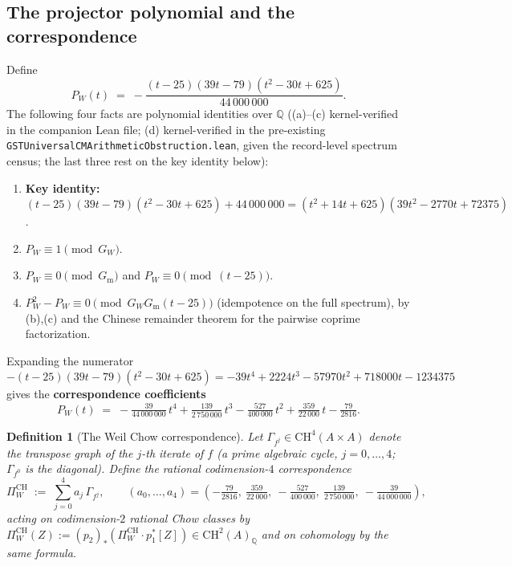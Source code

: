 \documentclass[11pt]{article}
\newtheorem{definition}{Definition}
\begin{document}
\subsection{The projector polynomial and the correspondence}\label{sec:projpoly}
Define
\[
P_W(t)\;=\;-\frac{(t-25)(39t-79)(t^2-30t+625)}{44\,000\,000}.
\]
The following four facts are polynomial identities over $\mathbb{Q}$ ((a)--(c) kernel-verified in the companion
Lean file; (d) kernel-verified in the pre-existing \texttt{GSTUniversalCMArithmeticObstruction.lean}, given the
record-level spectrum census; the last three rest on the key identity below):
\begin{enumerate}[label=(\alph*)]
\item \textbf{Key identity:}\quad $(t-25)(39t-79)(t^2-30t+625)+44\,000\,000=(t^2+14t+625)(39t^2-2770t+72375)$.
\item $P_W\equiv 1 \pmod{G_W}$.
\item $P_W\equiv 0 \pmod{G_{\mathrm{m}}}$ and $P_W\equiv 0\pmod{(t-25)}$.
\item $P_W^2-P_W\equiv 0\pmod{G_WG_{\mathrm{m}}(t-25)}$ (idempotence on the full spectrum), by (b),(c) and the
Chinese remainder theorem for the pairwise coprime factorization.
\end{enumerate}
Expanding the numerator $-(t-25)(39t-79)(t^2-30t+625)=-39t^4+2224t^3-57970t^2+718000t-1234375$ gives the
\textbf{correspondence coefficients}
\begin{equation}\label{eq:coeffs}
P_W(t)\;=\;-\tfrac{39}{44\,000\,000}\,t^4+\tfrac{139}{2\,750\,000}\,t^3-\tfrac{527}{400\,000}\,t^2
+\tfrac{359}{22\,000}\,t-\tfrac{79}{2816}.
\end{equation}

\begin{definition}[The Weil Chow correspondence]\label{def:corr}
Let $\Gamma_{f^j}\in \mathrm{CH}^{4}(A\times A)$ denote the transpose graph of the $j$-th iterate of $f$
(a prime algebraic cycle, $j=0,\dots,4$; $\Gamma_{f^0}$ is the diagonal). Define the rational codimension-$4$
correspondence
\[
\Pi_W^{\mathrm{CH}}\;:=\;\sum_{j=0}^{4}a_j\,\Gamma_{f^j},\qquad
(a_0,\dots,a_4)=\left(-\tfrac{79}{2816},\ \tfrac{359}{22\,000},\ -\tfrac{527}{400\,000},\
\tfrac{139}{2\,750\,000},\ -\tfrac{39}{44\,000\,000}\right),
\]
acting on codimension-$2$ rational Chow classes by
$\Pi_W^{\mathrm{CH}}(Z):=(p_2)_*(\Pi_W^{\mathrm{CH}}\cdot p_1^*[Z])\in \mathrm{CH}^{2}(A)_{\mathbb{Q}}$
and on cohomology by the same formula.
\end{definition}
\end{document}
